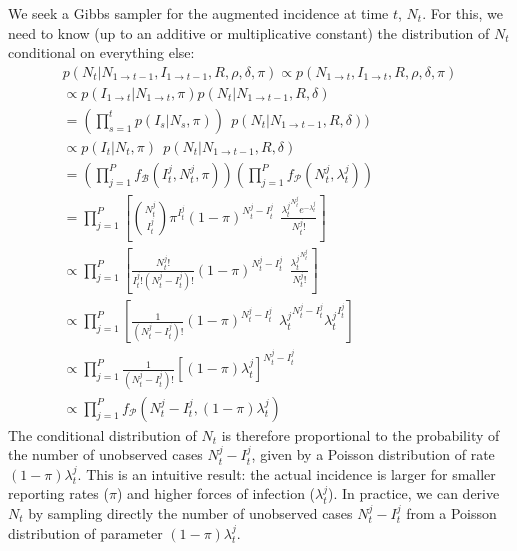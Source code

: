 \documentclass[a4paper,11pt]{article}
\begin{document}
We seek a Gibbs sampler for the augmented incidence at time $t$, $N_t$.
For this, we need to know (up to an additive or multiplicative constant) the 
distribution of $N_t$ conditional on everything else:
\begin{eqnarray}
p(N_t | N_{1 \rightarrow t-1}, I_{1 \rightarrow t-1}, R, \rho, \delta, \pi) 
\propto p(N_{1 \rightarrow t}, I_{1 \rightarrow t}, R, \rho, \delta, \pi) \\
\propto p( I_{1 \rightarrow t} | N_{1 \rightarrow t}, \pi) 
p(N_t | N_{1 \rightarrow t-1},  R, \delta) \\
= (\prod_{s=1}^t p(I_s| N_s, \pi)) \:\:
p(N_t | N_{1 \rightarrow t-1}, R, \delta))  \\
\propto p(I_t | N_t, \pi) \:\:
p(N_t | N_{1 \rightarrow t-1},  R, \delta)\\
= (\prod_{j=1}^P f_{\mathcal{B}}(I_t^j, N_t^j, \pi))
(\prod_{j=1}^P  f_{\mathcal{P}}(N_t^j, \lambda_t^j))\\
= \prod_{j=1}^P [ {N_t^j \choose I_t^j} \pi^{I_t^j} 
(1-\pi)^{N_t^j - I_t^j} \:\: 
\frac{{\lambda_t^j}^{N_t^j} e^{-\lambda_t^j}}{N_t^j!}]\\
\propto \prod_{j=1}^P [ \frac{N_t^j!}{I_t^j!(N_t^j-I_t^j)!} 
(1-\pi)^{N_t^j - I_t^j} \:\: 
\frac{{\lambda_t^j}^{N_t^j}}{N_t^j!}]\\
\propto \prod_{j=1}^P [ \frac{1}{(N_t^j-I_t^j)!} 
(1-\pi)^{N_t^j - I_t^j} \:\: 
{\lambda_t^j}^{N_t^j - I_t^j}{\lambda_t^j}^{I_t^j}]\\
\propto \prod_{j=1}^P \frac{1}{(N_t^j-I_t^j)!} 
[(1-\pi)\lambda_t^j]^{N_t^j - I_t^j}\\
\propto \prod_{j=1}^P f_{\mathcal{P}}(N_t^j-I_t^j , (1-\pi)\lambda_t^j)
\end{eqnarray}
The conditional distribution of $N_t$ is therefore proportional to the 
probability of the number of unobserved cases $N_t^j-I_t^j$, given by a Poisson 
distribution of rate $(1-\pi)\lambda_t^j$. This is an intuitive result: the 
actual incidence is larger for smaller reporting rates ($\pi$) and higher 
forces of infection ($\lambda_t^j$).
In practice, we can derive $N_t$ by sampling directly the number of unobserved 
cases $N_t^j-I_t^j$ from a Poisson distribution of parameter 
$(1-\pi)\lambda_t^j$.

%
%
\end{document}
